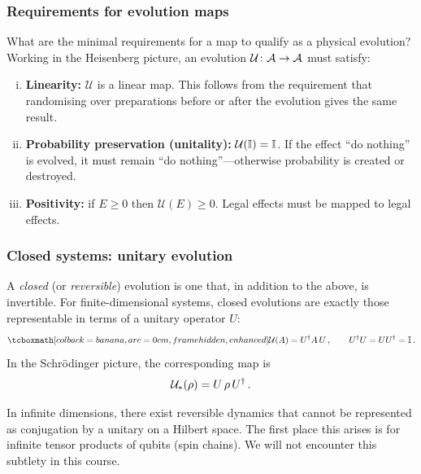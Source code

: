 \subsubsection{Requirements for evolution maps}%
\label{sec:evolution-requirements}

What are the minimal requirements for a map to qualify as a physical
evolution?  Working in the Heisenberg picture, an evolution
$\mathcal{U}\colon \mathcal{A} \to \mathcal{A}$ must satisfy:

\begin{enumerate}[(i)]
  \item \textbf{Linearity:} $\mathcal{U}$ is a linear map.  This
    follows from the requirement that randomising over preparations
    before or after the evolution gives the same result.
  \item \textbf{Probability preservation (unitality):}
    $\mathcal{U}(\mathbb{I}) = \mathbb{I}$.  If the effect ``do nothing'' is
    evolved, it must remain ``do nothing''---otherwise probability is
    created or destroyed.
  \item \textbf{Positivity:} if $E \geq 0$ then
    $\mathcal{U}(E) \geq 0$.  Legal effects must be mapped to legal
    effects.
\end{enumerate}

\subsubsection{Closed systems: unitary evolution}%
\label{sec:unitary-evol}

A \emph{closed} (or \emph{reversible}) evolution is one that, in
addition to the above, is invertible.  For finite-dimensional systems,
closed evolutions are exactly those representable in terms of a
unitary operator $U$:
\begin{equation}\label{eq:unitary-heisenberg}
  \eqbox{\mathcal{U}(A) = U^\adj A\, U}\,,\qquad U^\adj U = U U^\adj = \One\,.
\end{equation}
In the Schr\"odinger picture, the corresponding map is
\begin{equation}\label{eq:unitary-schrodinger}
  \mathcal{U}_*(\rho) = U\,\rho\, U^\dagger\,.
\end{equation}

\begin{remark}
  In infinite dimensions, there exist reversible dynamics that cannot be
  represented as conjugation by a unitary on a Hilbert space.  The
  first place this arises is for infinite tensor products of qubits
  (spin chains).  We will not encounter this subtlety in this course.
\end{remark}

